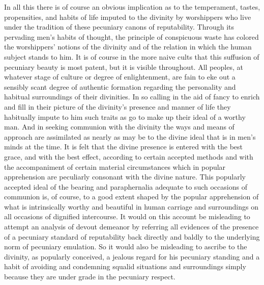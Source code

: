 \documentclass[12pt]{report}
\begin{document}
In all this there is of course an obvious implication as to the
temperament, tastes, propensities, and habits of life imputed to the
divinity by worshippers who live under the tradition of these pecuniary
canons of reputability. Through its pervading men's habits of thought,
the principle of conspicuous waste has colored the worshippers' notions
of the divinity and of the relation in which the human subject stands
to him. It is of course in the more naive cults that this suffusion
of pecuniary beauty is most patent, but it is visible throughout. All
peoples, at whatever stage of culture or degree of enlightenment, are
fain to eke out a sensibly scant degree of authentic formation regarding
the personality and habitual surroundings of their divinities. In so
calling in the aid of fancy to enrich and fill in their picture of the
divinity's presence and manner of life they habitually impute to him
such traits as go to make up their ideal of a worthy man. And in
seeking communion with the divinity the ways and means of approach are
assimilated as nearly as may be to the divine ideal that is in men's
minds at the time. It is felt that the divine presence is entered with
the best grace, and with the best effect, according to certain accepted
methods and with the accompaniment of certain material circumstances
which in popular apprehension are peculiarly consonant with the divine
nature. This popularly accepted ideal of the bearing and paraphernalia
adequate to such occasions of communion is, of course, to a good extent
shaped by the popular apprehension of what is intrinsically worthy
and beautiful in human carriage and surroundings on all occasions of
dignified intercourse. It would on this account be misleading to
attempt an analysis of devout demeanor by referring all evidences of
the presence of a pecuniary standard of reputability back directly and
baldly to the underlying norm of pecuniary emulation. So it would also
be misleading to ascribe to the divinity, as popularly conceived, a
jealous regard for his pecuniary standing and a habit of avoiding and
condemning squalid situations and surroundings simply because they are
under grade in the pecuniary respect.
\end{document}
